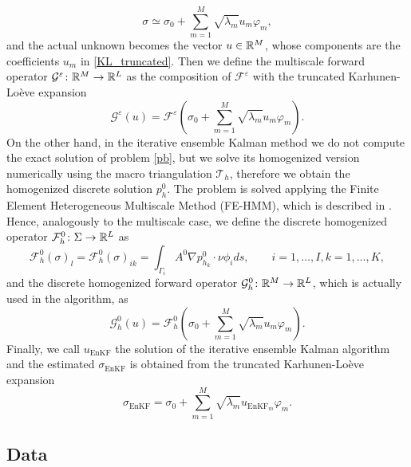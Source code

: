 \documentclass[10pt]{article}
\begin{document}
\begin{equation}
\label{KL_truncated}
\sigma \simeq \sigma_0 + \sum_{m=1}^{M} \sqrt{\lambda_m} u_m \varphi_m,
\end{equation}
and the actual unknown becomes the vector $u \in \mathbb{R}^M$, whose components are the coefficients $u_m$ in \eqref{KL_truncated}. Then we define the multiscale forward operator $\mathcal{G}^{\varepsilon} \colon \mathbb{R}^M \to \mathbb{R}^L$ as the composition of $\mathcal{F}^{\varepsilon}$ with the truncated Karhunen-Lo\`eve expansion
\[ \mathcal{G}^{\varepsilon}(u) = \mathcal{F}^{\varepsilon} \left ( \sigma_0 + \sum_{m=1}^{M} \sqrt{\lambda_m} u_m \varphi_m \right ). \]
On the other hand, in the iterative ensemble Kalman method we do not compute the exact solution of problem \eqref{pb}, but we solve its homogenized version numerically using the macro triangulation $\mathcal{T}_h$, therefore we obtain the homogenized discrete solution $p^0_h$. The problem is solved applying the Finite Element Heterogeneous Multiscale Method (FE-HMM), which is described in \cite{AEE12}. Hence, analogously to the multiscale case, we define the discrete homogenized operator $\mathcal{F}_h^0 \colon \Sigma \to \mathbb{R}^L$ as
\begin{equation}
\label{boundary_integral_0}
\mathcal{F}_h^{0}(\sigma)_{l} = \mathcal{F}_h^{0}(\sigma)_{ik} = \int_{\Gamma_i} A^{0} \nabla p_{h_k}^{0} \cdot \nu \phi_i ds, \qquad i = 1, \dots, I, k = 1, \dots, K,
\end{equation}
and the discrete homogenized forward operator $\mathcal{G}^0_h \colon \mathbb{R}^M \to \mathbb{R}^L$, which is actually used in the algorithm, as
\[ \mathcal{G}_h^{0}(u) = \mathcal{F}_h^{0} \left ( \sigma_0 + \sum_{m=1}^{M} \sqrt{\lambda_m} u_m \varphi_m \right ). \]
Finally, we call $u_{\mathrm{EnKF}}$ the solution of the iterative ensemble Kalman algorithm and the estimated $\sigma_{\mathrm{EnKF}}$ is obtained from the truncated Karhunen-Lo\`eve expansion
\[ \sigma_{\mathrm{EnKF}} = \sigma_0 + \sum_{m=1}^M \sqrt{\lambda_m} u_{\mathrm{EnKF}_m} \varphi_m. \]

\subsection{Data}
\end{document}
